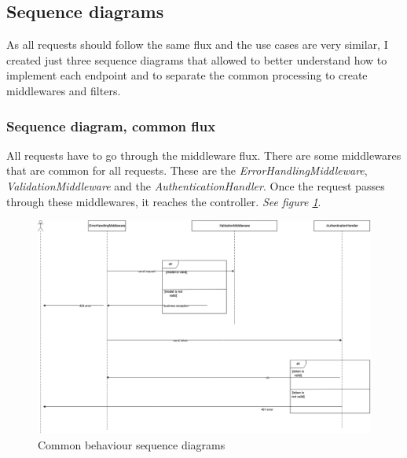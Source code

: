     \subsection{Sequence diagrams}
        As all requests should follow the same flux and the use cases are very similar, I created just three sequence diagrams that allowed
        to better understand how to implement each endpoint and to separate the common processing to create middlewares and filters.

        \subsubsection{Sequence diagram, common flux}
            All requests have to go through the middleware flux. There are some middlewares that are common for all requests. These are the \textit{ErrorHandlingMiddleware}, \textit{ValidationMiddleware} and the \textit{AuthenticationHandler}.
            Once the request passes through these middlewares, it reaches the controller. \textit{See figure \ref{fig:implementation_common}}.
                \begin{figure}[H]
                    \centering
                        \includegraphics[width=\textwidth]{assets/diagrams/sequence_common.png}
                    \caption{Common behaviour sequence diagrams}
                    \label{fig:implementation_common}
                \end{figure}

